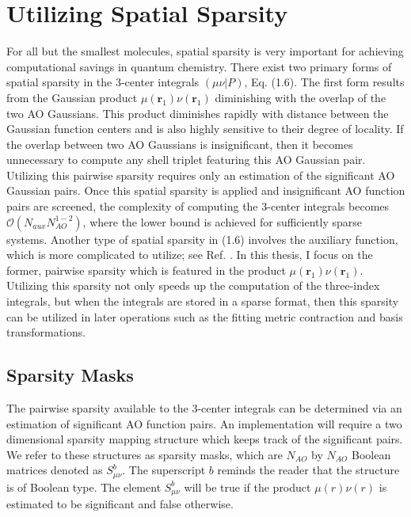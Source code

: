 \chapter{Utilizing Spatial Sparsity}

For all but the smallest molecules, spatial sparsity is very important for achieving computational savings
in quantum chemistry. There exist two primary forms of spatial sparsity in the 3-center integrals $(\mu \nu |P)$, Eq. (1.6). 
The first form results from the Gaussian product $\mu(\textbf{r}_{1}) \nu(\textbf{r}_{1})$ diminishing with the overlap of the 
two AO Gaussians. This product diminishes rapidly with distance between the Gaussian function centers and is also 
highly sensitive to their degree of locality.
If the overlap between two AO Gaussians is insignificant, then it becomes unnecessary to compute any shell triplet featuring
this AO Gaussian pair.
Utilizing this pairwise sparsity requires only an estimation of the significant AO Gaussian pairs.
Once this spatial sparsity is applied and insignificant AO function pairs are screened, the complexity of 
computing the 3-center integrals becomes $\mathcal{O}(N_{aux}N_{AO}^{1-2})$, where the lower bound is achieved for sufficiently 
sparse systems. Another type of spatial sparsity in (1.6) involves the auxiliary function, which is more complicated to 
utilize; see Ref. \cite{ref5}. In this thesis, I focus on the former, pairwise sparsity which is featured
in the product $\mu(\textbf{r}_{1}) \nu(\textbf{r}_{1})$. 
Utilizing this sparsity not only speeds up the computation of the three-index integrals, but when the integrals are stored in a sparse format,
then this sparsity can be utilized in later operations such as the fitting metric contraction and basis transformations.

\section{Sparsity Masks}

The pairwise sparsity available to the 3-center integrals can be determined via an estimation of significant AO function pairs.
An implementation will require a two dimensional sparsity mapping structure which keeps track of the significant pairs.
We refer to these structures as sparsity masks, which are $N_{AO}$ by $N_{AO}$ Boolean matrices denoted as $S_{\mu \nu}^b$. 
The superscript $b$ reminds the reader that the structure is of Boolean type.
The element $S_{\mu \nu}^b$ will be true if the product $\mu(r)\nu(r)$ is estimated to be significant 
and false otherwise.

